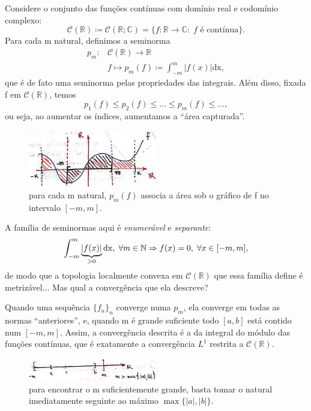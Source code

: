 \documentclass[../distribution_theory_notes.tex]{subfiles}
\begin{document}
  \begin{example}
    Considere o conjunto das funções contínuas com domínio real e codomínio complexo: 
      \[
        \mathcal{C}(\mathbb{R})\coloneqq \mathcal{C}(\mathbb{R}; \mathbb{C})=\{f:\mathbb{R}\rightarrow \mathbb{C}:\; f\text{ é contínua}\}.
      \]
      Para cada m natural, definimos a seminorma 
     \begin{align*}
       p_{m}:&\mathcal{C}(\mathbb{R})\rightarrow \mathbb{R}\\ 
             &f\mapsto p_{m}(f)\coloneqq \int_{-m}^{m}|f(x)| \mathrm{dx},
     \end{align*}
     que é de fato uma seminorma pelas propriedades das integrais. Além disso, fixada f em \(\mathcal{C}(\mathbb{R})\), temos 
       \[
         p_{1}(f)\leq p_{2}(f)\leq \dotsc \leq p_{m}(f)\leq \dotsc,
       \]
       ou seja, ao aumentar os índices, aumentamos a ``área capturada''. 
      \begin{figure}[H]
      \begin{center}
      \includegraphics[height=0.5\textheight, width=0.5\textwidth, keepaspectratio]{./Images/integral_seminorms_03.png}
      \end{center}
      \caption{para cada m natural, \(p_{m}(f)\) associa a área sob o gráfico de f no intervalo \([-m, m]\).}
      \end{figure}

      A família de seminormas aqui é \textit{enumerável} e \textit{separante}:
        \[
          \int_{-m}^{m}\underbrace{|f(x)|}_{\mathclap{>0}} \mathrm{dx},\; \forall m\in \mathbb{N} \Rightarrow f(x)=0,\; \forall x\in [-m, m],
        \]
        de modo que a topologia localmente convexa em \(\mathcal{C}(\mathbb{R})\) que essa família define é metrizável... Mas qual a convergência que ela descreve? 

        Quando uma sequência \(\{f_{n}\}_{n}\) converge numa \(p_{m}\), ela converge em todas as normas ``anteriores'', e, quando m é grande suficiente todo \([a, b]\) está contido num \([-m, m]\). Assim, a convergência descrita é a da integral do módulo das funções contínuas, que é exatamente a convergência \(L^{1}\) restrita a \(\mathcal{C}(\mathbb{R})\).
       \begin{figure}[H]
       \begin{center}
         \includegraphics[height=0.5\textheight, width=0.5\textwidth, keepaspectratio]{./Images/natural_interval_03.png}
       \end{center}
       \caption{para encontrar o m suficientemente grande, basta tomar o natural imediatamente seguinte ao máximo \(\max\{|a|, |b|\}\).}
       \end{figure}
  \end{example}
\end{document}
